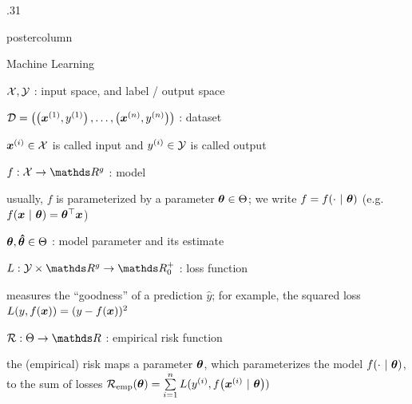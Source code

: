 \documentclass[11pt,compress,t,notes=noshow, xcolor=table]{beamer}
\begin{document}
\begin{frame}[fragile]{}
\begin{columns}
\begin{column}{.31\textwidth}
\begin{beamercolorbox}[center]{postercolumn}
\begin{minipage}{.98\textwidth}
{						\begin{myblock}{Machine Learning}
							\begin{codebox}
								$\mathcal{X}, \mathcal{Y}$ : input space, and label / output space 
						\end{codebox}
						\hspace*{1ex}
						\begin{codebox}
							 $\mathcal{D} = \left( \left(\bm{x}^{(1)}, y^{(1)}\right), \ldots, \left(\bm{x}^{(n)}, y^{(n)}\right)\right)$ : dataset
						\end{codebox}
						\hspace*{1ex} $\bm{x}^{(i)} \in \mathcal{X}$ is called input and $y^{(i)} \in \mathcal{Y}$ is called output \\
						\begin{codebox}
							 $f: \Xspace \to \R^g$ : model
						\end{codebox}
						\hspace*{1ex} usually, $f$ is parameterized by a parameter $\bm{\theta} \in \Theta$; we write $f = f(\cdot ~|~ \bm{\theta})$ (e.g. $f(\bm{x} ~|~ \bm{\theta}) = \bm{\theta}^\top \bm{x}$)\\
						\begin{codebox}
							 $\bm{\theta}, \bm{\hat\theta} \in \Theta$ : model parameter and its estimate
						\end{codebox}
						\hspace*{1ex}
						\begin{codebox}
							 $L: \Yspace \times \R^g \to \R^+_0$ : loss function
						\end{codebox}
						\hspace*{1ex} measures the \enquote{goodness} of a prediction $\hat y$; for example, the squared loss $L(y, f(\bm{x})) = (y - f(\bm{x}))^2$ \\
						\begin{codebox}
							 $\risk: \Theta \to \R$ : empirical risk function
						\end{codebox}
						\hspace*{1ex} the (empirical) risk maps a parameter $\bm{\theta}$, which parameterizes the model $f(\cdot ~|~ \bm{\theta})$, to the sum of losses
						$\mathcal{R}_{\text{emp}}(\bm{\theta}) = \sum\limits_{i=1}^n L(y^{(i)}, f\big(\bm{x}^{(i)} ~|~ \bm{\theta}\big))$
					\end{myblock}
				}
			\end{minipage}
		\end{beamercolorbox}
	\end{column}
\end{columns}
\end{frame}

\newpage
\end{document}
